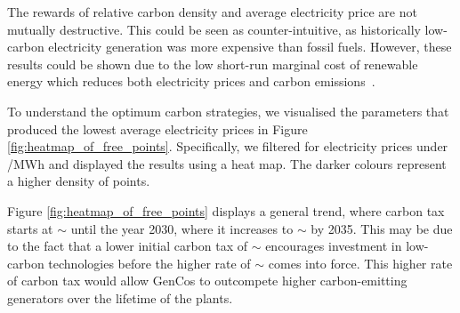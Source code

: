 The rewards of relative carbon density and average electricity price are not mutually destructive. This could be seen as counter-intuitive, as historically low-carbon electricity generation was more expensive than fossil fuels. However, these results could be shown due to the low short-run marginal cost of renewable energy which reduces both electricity prices and carbon emissions~\cite{OMahoney2011}.





To understand the optimum carbon strategies, we visualised the parameters that produced the lowest average electricity prices in Figure \ref{fig:heatmap_of_free_points}. Specifically, we filtered for electricity prices under /MWh and displayed the results using a heat map. The darker colours represent a higher density of points. 

Figure \ref{fig:heatmap_of_free_points} displays a general trend, where carbon tax starts at ${\sim}$ until the year 2030, where it increases to ${\sim}$ by 2035. This may be due to the fact that a lower initial carbon tax of ${\sim}$ encourages investment in low-carbon technologies before the higher rate of ${\sim}$ comes into force. This higher rate of carbon tax would allow GenCos to outcompete higher carbon-emitting generators over the lifetime of the plants.







